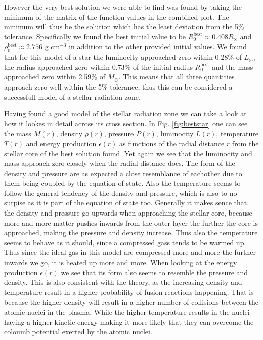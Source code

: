 \documentclass{emulateapj}
\begin{document}
	However the very best solution we were able to find was found by taking the minimum of the matrix of the function values in the combined plot. The minimum will thus be the solution which has the least deviation from the 5\% tolerance. Specifically we found the best initial value to be $R_0^\text{best} \approx 0.408 R_\odot$ and $\rho_0^\text{best} \approx 2.756$ g cm$^{-3}$ in addition to the other provided initial values. We found that for this model of a star the luminocity approached zero within 0.28\% of $L_\odot$, the radius approached zero within 0.73\% of the initial radius $R_0^\text{best}$ and the mass approached zero within 2.59\% of $M_\odot$. This means that all three quantities approach zero well within the 5\% tolerance, thus this can be considered a successfull model of a stellar radiation zone.
	
	Having found a good model of the stellar radiation zone we can take a look at how it lookes in detail across its cross section. In Fig. \ref{fig:beststar} one can see the mass $M(r)$, density $\rho(r)$, pressure $P(r)$, luminocity $L(r)$, temperature $T(r)$ and energy production $\epsilon(r)$ as functions of the radial distance $r$ from the stellar core of the best solution found. Yet again we see that the luminocity and mass approach zero closely when the radial distance does. The form of the density and pressure are as expected a close resemblance of eachother due to them being coupled by the equation of state. Also the temperature seems to follow the general tendency of the density and pressure, which is also to no surpise as it is part of the equation of state too. Generally it makes sence that the density and pressure go upwards when approaching the stellar core, because more and more matter pushes inwards from the outer layer the further the core is approached, making the pressure and density increase. Thus also the temperature seems to behave as it should, since a compressed gass tends to be warmed up. Thus since the ideal gas in this model are compressed more and more the further inwards we go, it is heated up more and more. When looking at the energy production $\epsilon(r)$ we see that its form also seems to resemble the pressure and density. This is also consistent with the theory, as the increasing density and temperature result in a higher probability of fusion reactions happening. That is because the higher density will result in a higher number of collisions between the atomic nuclei in the plasma. While the higher temperature results in the nuclei having a higher kinetic energy making it more likely that they can overcome the coloumb potential exerted by the atomic nuclei. 
	
\end{document}
